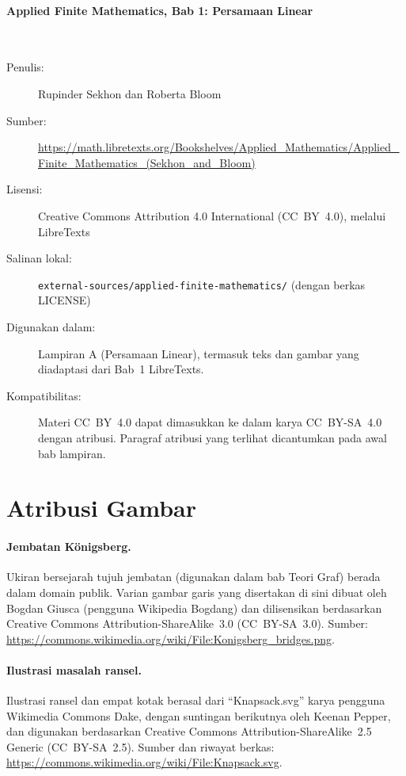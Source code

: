 \paragraph{Applied Finite Mathematics, Bab 1: Persamaan Linear}\hspace{0pt}\\[-0.6em]
\begin{description}
  \item[Penulis:] Rupinder Sekhon dan Roberta Bloom
  \item[Sumber:] \url{https://math.libretexts.org/Bookshelves/Applied_Mathematics/Applied_Finite_Mathematics_(Sekhon_and_Bloom)}
  \item[Lisensi:] Creative Commons Attribution 4.0 International
    (CC~BY~4.0), melalui LibreTexts
  \item[Salinan lokal:] \texttt{external-sources/applied-finite-mathematics/}
    (dengan berkas LICENSE)
  \item[Digunakan dalam:] Lampiran A (Persamaan Linear), termasuk teks dan
    gambar yang diadaptasi dari Bab~1 LibreTexts.
  \item[Kompatibilitas:] Materi CC~BY~4.0 dapat dimasukkan ke dalam karya
    CC~BY-SA~4.0 dengan atribusi. Paragraf atribusi yang terlihat
    dicantumkan pada awal bab lampiran.
\end{description}

\section*{Atribusi Gambar}

\paragraph{Jembatan K\"onigsberg.}
Ukiran bersejarah tujuh jembatan (digunakan dalam bab Teori Graf) berada
dalam domain publik. Varian gambar garis yang disertakan di sini dibuat
oleh Bogdan Giusca (pengguna Wikipedia Bogdang) dan dilisensikan berdasarkan
Creative Commons Attribution-ShareAlike~3.0 (CC~BY-SA~3.0).
Sumber: \url{https://commons.wikimedia.org/wiki/File:Konigsberg_bridges.png}.

\paragraph{Ilustrasi masalah ransel.}
Ilustrasi ransel dan empat kotak berasal dari ``Knapsack.svg'' karya pengguna
Wikimedia Commons Dake, dengan suntingan berikutnya oleh Keenan Pepper, dan
digunakan berdasarkan Creative Commons Attribution-ShareAlike~2.5 Generic
(CC~BY-SA~2.5). Sumber dan riwayat berkas:
\url{https://commons.wikimedia.org/wiki/File:Knapsack.svg}.

